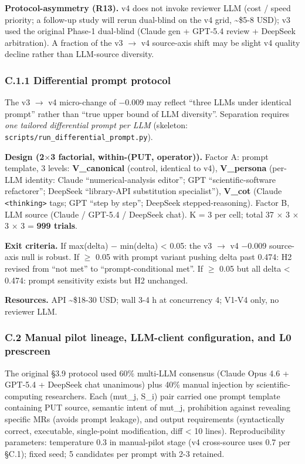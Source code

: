 \documentclass[review,12pt,authoryear]{elsarticle}
\begin{document}
\textbf{Protocol-asymmetry (R13).} v4 does not invoke reviewer LLM (cost
/ speed priority; a follow-up study will rerun dual-blind on the v4
grid, \textasciitilde\$5-8 USD); v3 used the original Phase-1 dual-blind
(Claude gen + GPT-5.4 review + DeepSeek arbitration). A fraction of the
v3 $\to$ v4 source-axis shift may be slight v4 quality decline rather than
LLM-source diversity.

\subsubsection{C.1.1 Differential prompt protocol}\label{c.1.1-differential-prompt-protocol-future-work-commitment}

The v3 $\to$ v4 micro-change of −0.009 may reflect ``three LLMs under
identical prompt'' rather than ``true upper bound of LLM diversity''.
Separation requires \emph{one tailored differential prompt per LLM}
(skeleton: \texttt{scripts/run\_differential\_prompt.py}).

\textbf{Design (2$\times$3 factorial, within-(PUT, operator)).} Factor A:
prompt template, 3 levels: \textbf{V\_canonical} (control, identical to
v4), \textbf{V\_persona} (per-LLM identity: Claude ``numerical-analysis
editor''; GPT ``scientific-software refactorer''; DeepSeek ``library-API
substitution specialist''), \textbf{V\_cot} (Claude
\texttt{\textless{}thinking\textgreater{}} tags; GPT ``step by step'';
DeepSeek stepped-reasoning). Factor B, LLM source (Claude / GPT-5.4 /
DeepSeek chat). K = 3 per cell; total 37 $\times$ 3 $\times$ 3 $\times$ 3 = \textbf{999
trials}.

\textbf{Exit criteria.} If max(delta) − min(delta) \textless{} 0.05: the
v3 $\to$ v4 −0.009 source-axis null is robust. If $\geq$ 0.05 with prompt variant
pushing delta past 0.474: H2 revised from ``not met'' to
``prompt-conditional met''. If $\geq$ 0.05 but all delta \textless{} 0.474:
prompt sensitivity exists but H2 unchanged.

\textbf{Resources.} API \textasciitilde\$18-30 USD; wall 3-4 h at
concurrency 4; V1-V4 only, no reviewer LLM.

\subsubsection{C.2 Manual pilot lineage, LLM-client configuration, and L0 prescreen}\label{c.2-manual-pilot-lineage-llm-client-configuration-and-l0-prescreen}

The original §3.9 protocol used 60\% multi-LLM consensus (Claude Opus
4.6 + GPT-5.4 + DeepSeek chat unanimous) plus 40\% manual injection by
scientific-computing researchers. Each (mut\_j, S\_i) pair carried one
prompt template containing PUT source, semantic intent of mut\_j,
prohibition against revealing specific MRs (avoids prompt leakage), and
output requirements (syntactically correct, executable, single-point
modification, diff \textless{} 10 lines). Reproducibility parameters:
temperature 0.3 in manual-pilot stage (v4 cross-source uses 0.7 per
§C.1); fixed seed; 5 candidates per prompt with 2-3 retained.
\end{document}
